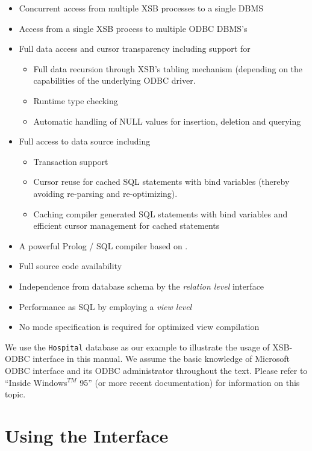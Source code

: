 \begin{itemize} 
\item Concurrent access from multiple XSB processes to a single DBMS
\item Access from a single XSB process to multiple ODBC DBMS's
\item Full data access and cursor transparency including support for
        \begin{itemize}
        \item Full data recursion through XSB's tabling mechanism 
	(depending on the capabilities of the underlying ODBC driver.
        \item Runtime type checking
        \item Automatic handling of NULL values for insertion, 
                deletion and querying
        \end{itemize}
\item Full access to data source including
        \begin{itemize}
        \item Transaction support
        \item Cursor reuse for cached SQL statements 
                with bind variables (thereby avoiding re-parsing and 
		re-optimizing).
        \item Caching compiler generated SQL statements with bind variables 
                and efficient cursor management for cached statements
        \end{itemize}
\item A powerful Prolog / SQL compiler based on \cite{Drax92}.
\item Full source code availability
\item Independence from database schema by the {\it relation level} interface
\item Performance as SQL by employing a {\it view level} 
\item No mode specification is required for optimized view compilation
\end{itemize}

We use the {\tt Hospital} database as our example to illustrate 
the usage of XSB-ODBC interface in this manual. We assume the basic 
knowledge of Microsoft ODBC interface and its ODBC administrator 
throughout the text.  Please refer to ``Inside Windows$^{TM}$ 95''
(or more recent documentation) for information on this topic.

\section{Using the Interface}

